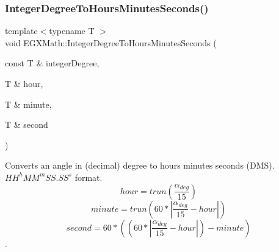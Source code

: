 \subsubsection{\texorpdfstring{Integer\+Degree\+To\+Hours\+Minutes\+Seconds()}{IntegerDegreeToHoursMinutesSeconds()}}
{\footnotesize\ttfamily template$<$typename T $>$ \\
void E\+G\+X\+Math\+::\+Integer\+Degree\+To\+Hours\+Minutes\+Seconds (\begin{DoxyParamCaption}\item[{const T \&}]{integer\+Degree,  }\item[{T \&}]{hour,  }\item[{T \&}]{minute,  }\item[{T \&}]{second }\end{DoxyParamCaption})}



Converts an angle in (decimal) degree to hours minutes seconds (D\+MS). ${HH}^{h}{MM}^{m}{SS.SS}^{s}$ format. \[hour=trun(\frac{\alpha_{deg}}{15})\] \[minute=trun(60 * |\frac{\alpha_{deg}}{15} - hour|)\] \[second=60 * ((60 * |\frac{\alpha_{deg}}{15} - hour|)-minute)\]. 

